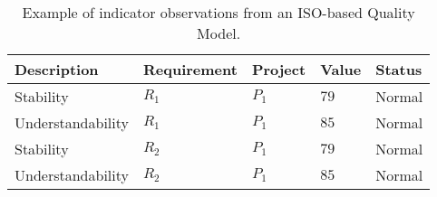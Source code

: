 \begin{table}[!htb]
\renewcommand{\arraystretch}{1.3}
\scriptsize
\begin{center}
\begin{tabular}{|p{2.5cm}|p{3cm}|p{2cm}|p{1cm}|p{1.5cm}|}
\hline
  \textbf{Description} & \textbf{Requirement} & \textbf{Project} & \textbf{Value} & \textbf{Status} \\  \hline
  Stability & $R_1$ & $P_1$ & $79$ & Normal \\ \hline
  Understandability & $R_1$ & $P_1$  & $85$ & Normal\\ \hline
  Stability & $R_2$ & $P_1$ & $79$ & Normal \\ \hline
  Understandability & $R_2$ & $P_1$  & $85$ & Normal\\ \hline
  \hline
  \end{tabular}
  \caption{Example of indicator observations from an ISO-based Quality Model.}
  \label{tab:example-wb}
  \end{center}	 
\end{table} 

% 
% 
% 
% 	 	
% 
% 
